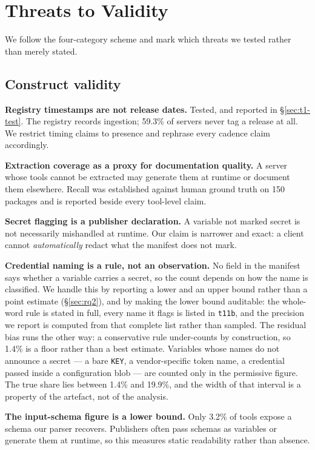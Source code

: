 \documentclass[a4paper,fleqn]{cas-dc}
\begin{document}
\section{Threats to Validity}\label{sec:threats}

We follow the four-category scheme and mark which threats we tested rather than
merely stated.

\subsection{Construct validity}

\textbf{Registry timestamps are not release dates.} Tested, and reported in
\S\ref{sec:t1-test}. The registry records ingestion; 59.3\% of servers never
tag a release at all. We restrict timing claims to presence and rephrase every
cadence claim accordingly.

\textbf{Extraction coverage as a proxy for documentation quality.} A server
whose tools cannot be extracted may generate them at runtime or document them
elsewhere. Recall was established against human ground truth on 150 packages
and is reported beside every tool-level claim.

\textbf{Secret flagging is a publisher declaration.} A variable not marked
secret is not necessarily mishandled at runtime. Our claim is narrower and
exact: a client cannot \emph{automatically} redact what the manifest does not
mark.

\textbf{Credential naming is a rule, not an observation.} No field in the
manifest says whether a variable carries a secret, so the count depends on how
the name is classified. We handle this by reporting a lower and an upper bound
rather than a point estimate (\S\ref{sec:rq2}), and by making the lower bound
auditable: the whole-word rule is stated in full, every name it flags is listed
in \texttt{t11b}, and the precision we report is computed from that complete
list rather than sampled. The residual bias runs the other way: a conservative
rule under-counts by construction, so 1.4\% is a floor rather than a best
estimate. Variables whose names do not announce a secret --- a bare
\texttt{KEY}, a vendor-specific token name, a credential passed inside a
configuration blob --- are counted only in the permissive figure. The true
share lies between 1.4\% and 19.9\%, and the width of that interval is a
property of the artefact, not of the analysis.

\textbf{The input-schema figure is a lower bound.} Only 3.2\% of tools expose a
schema our parser recovers. Publishers often pass schemas as variables or
generate them at runtime, so this measures static readability rather than
absence.
\end{document}
